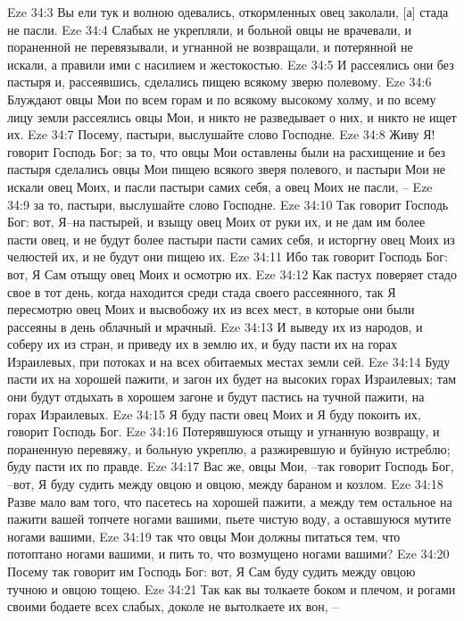 Eze 34:3  Вы ели тук и волною одевались, откормленных овец заколали, [а] стада не пасли.
Eze 34:4  Слабых не укрепляли, и больной овцы не врачевали, и пораненной не перевязывали, и угнанной не возвращали, и потерянной не искали, а правили ими с насилием и жестокостью.
Eze 34:5  И рассеялись они без пастыря и, рассеявшись, сделались пищею всякому зверю полевому.
Eze 34:6  Блуждают овцы Мои по всем горам и по всякому высокому холму, и по всему лицу земли рассеялись овцы Мои, и никто не разведывает о них, и никто не ищет их.
Eze 34:7  Посему, пастыри, выслушайте слово Господне.
Eze 34:8  Живу Я! говорит Господь Бог; за то, что овцы Мои оставлены были на расхищение и без пастыря сделались овцы Мои пищею всякого зверя полевого, и пастыри Мои не искали овец Моих, и пасли пастыри самих себя, а овец Моих не пасли, --
Eze 34:9  за то, пастыри, выслушайте слово Господне.
Eze 34:10  Так говорит Господь Бог: вот, Я--на пастырей, и взыщу овец Моих от руки их, и не дам им более пасти овец, и не будут более пастыри пасти самих себя, и исторгну овец Моих из челюстей их, и не будут они пищею их.
Eze 34:11  Ибо так говорит Господь Бог: вот, Я Сам отыщу овец Моих и осмотрю их.
Eze 34:12  Как пастух поверяет стадо свое в тот день, когда находится среди стада своего рассеянного, так Я пересмотрю овец Моих и высвобожу их из всех мест, в которые они были рассеяны в день облачный и мрачный.
Eze 34:13  И выведу их из народов, и соберу их из стран, и приведу их в землю их, и буду пасти их на горах Израилевых, при потоках и на всех обитаемых местах земли сей.
Eze 34:14  Буду пасти их на хорошей пажити, и загон их будет на высоких горах Израилевых; там они будут отдыхать в хорошем загоне и будут пастись на тучной пажити, на горах Израилевых.
Eze 34:15  Я буду пасти овец Моих и Я буду покоить их, говорит Господь Бог.
Eze 34:16  Потерявшуюся отыщу и угнанную возвращу, и пораненную перевяжу, и больную укреплю, а разжиревшую и буйную истреблю; буду пасти их по правде.
Eze 34:17  Вас же, овцы Мои, --так говорит Господь Бог, --вот, Я буду судить между овцою и овцою, между бараном и козлом.
Eze 34:18  Разве мало вам того, что пасетесь на хорошей пажити, а между тем остальное на пажити вашей топчете ногами вашими, пьете чистую воду, а оставшуюся мутите ногами вашими,
Eze 34:19  так что овцы Мои должны питаться тем, что потоптано ногами вашими, и пить то, что возмущено ногами вашими?
Eze 34:20  Посему так говорит им Господь Бог: вот, Я Сам буду судить между овцою тучною и овцою тощею.
Eze 34:21  Так как вы толкаете боком и плечом, и рогами своими бодаете всех слабых, доколе не вытолкаете их вон, --
